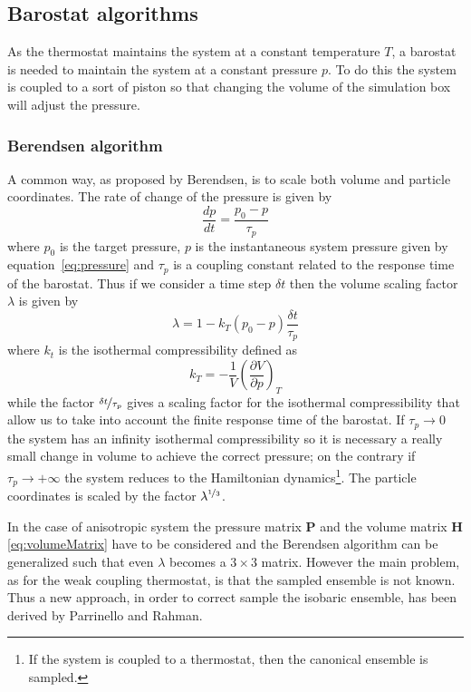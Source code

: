\subsection{Barostat algorithms} %
As the thermostat maintains the system at a constant temperature $T$, a barostat is needed to maintain the system
at a constant pressure $p$. To do this the system is coupled to a sort of piston so that changing the volume of
the simulation box will adjust the pressure.

\subsubsection{Berendsen algorithm}
A common way, as proposed by Berendsen, is to scale both volume and particle coordinates. The rate of change of
the pressure is given by
\begin{equation*}
	\frac{dp}{dt} = \frac{p_0 - p}{\tau_p}
\end{equation*}
where $p_0$ is the target pressure, $p$ is the instantaneous system pressure given by
equation~\eqref{eq:pressure} and $\tau_p$ is a coupling constant related to the response time of the barostat.
Thus if we consider a time step $\delta t$ then the volume scaling factor $\lambda$ is given by
\begin{equation*}
	\lambda = 1- k_T (p_0 - p) \frac{\delta t}{\tau_p}
\end{equation*}
where $k_t$ is the isothermal compressibility defined as
\begin{equation*}
	k_T = -\frac{1}{V}\left ( \frac{\partial V}{\partial p}\right )_{T}
\end{equation*}
while the factor $\nicefrac{\delta t}{\tau_p}$ gives a scaling factor for the isothermal compressibility that
allow us to take into account the finite response time of the barostat. If $\tau_p \rightarrow 0$ the system has
an infinity isothermal compressibility so it is necessary a really small change in volume to achieve the correct
pressure; on the contrary if $\tau_p \rightarrow +\infty$ the system reduces to the Hamiltonian
dynamics\footnote{If the system is coupled to a thermostat, then the canonical ensemble is sampled.}. The
particle coordinates is scaled by the factor $\lambda^{\nicefrac{1}{3}}$.

In the case of anisotropic system the pressure matrix $\mathbold{P}$ and the volume matrix $\mathbold{H}$
\eqref{eq:volumeMatrix} have to be considered and the Berendsen algorithm can be generalized such that even
$\lambda$ becomes a $3\times 3$ matrix. However the main problem, as for the weak coupling thermostat, is that
the sampled ensemble is not known. Thus a new approach, in order to correct sample the isobaric ensemble, has
been derived by Parrinello and Rahman.

